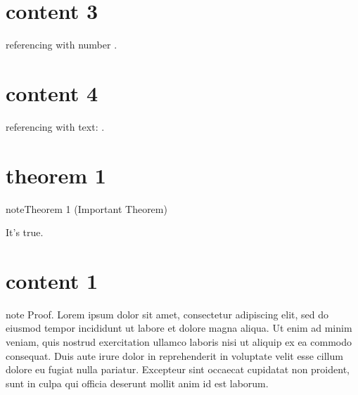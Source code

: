\chapter{content 3}
\label{\detokenize{algorithm/_algo_numbered_reference:content-3}}\label{\detokenize{algorithm/_algo_numbered_reference::doc}}
\sphinxAtStartPar
referencing with number {\hyperref[\detokenize{algorithm/_algo_labeled_titled_with_classname:test-algo-label}]{}}.

\sphinxstepscope


\chapter{content 4}
\label{\detokenize{algorithm/_algo_text_reference:content-4}}\label{\detokenize{algorithm/_algo_text_reference::doc}}
\sphinxAtStartPar
referencing with text: {\hyperref[\detokenize{algorithm/_algo_labeled_titled_with_classname:test-algo-label}]{}}.

\sphinxstepscope


\chapter{theorem 1}
\label{\detokenize{theorem/_theorems_with_number:theorem-1}}\label{\detokenize{theorem/_theorems_with_number::doc}}\label{theorem/_theorems_with_number:theorem-one}
\begin{sphinxadmonition}{note}{Theorem 1 (Important Theorem)}



\sphinxAtStartPar
It’s true.
\end{sphinxadmonition}

\sphinxstepscope


\chapter{content 1}
\label{\detokenize{proof/_proof_with_classname:content-1}}\label{\detokenize{proof/_proof_with_classname::doc}}
\begin{sphinxadmonition}{note}
\sphinxAtStartPar
Proof. Lorem ipsum dolor sit amet, consectetur adipiscing elit, sed do eiusmod tempor incididunt ut labore et dolore magna aliqua. Ut enim ad minim veniam, quis nostrud exercitation ullamco laboris nisi ut aliquip ex ea commodo consequat. Duis aute irure dolor in reprehenderit in voluptate velit esse cillum dolore eu fugiat nulla pariatur. Excepteur sint occaecat cupidatat non proident, sunt in culpa qui officia deserunt mollit anim id est laborum.
\end{sphinxadmonition}

